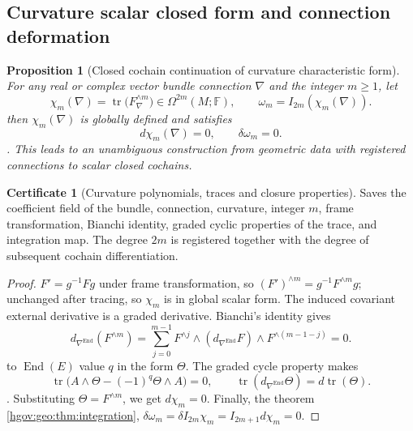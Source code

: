 \documentclass[12pt,a4paper,openany,notitlepage]{report}
\theoremstyle{plain}
\newtheorem{proposition}[theorem]{Proposition}
\theoremstyle{definition}
\newtheorem*{certificate}{Certificate}
\theoremstyle{remark}
\begin{document}
\begin{CJK*}
\section { Curvature scalar closed form and connection deformation }\label{exp:geo:section:curvature-classes}


\begin{proposition}
[Closed cochain continuation of curvature characteristic form]\label{hgov:geo:prop:curvature-cocycle}
For any real or complex vector bundle connection $\nabla$ and the integer $m\ge1$, let \[
\chi_m(\nabla)=\operatorname{tr}
\bigl(F_\nabla^{\wedge m}\bigr)\in\Omega^{2m}(M;\mathbb F),
\qquad
\omega_m=I_{2m}(\chi_m(\nabla)).
\] then $\chi_m(\nabla)$ is globally defined and satisfies \[
d\chi_m(\nabla)=0,\qquad\delta\omega_m=0.
\]. This leads to an unambiguous construction from geometric data with registered connections to scalar closed cochains.\end{proposition}


\begin{certificate}
[Curvature polynomials, traces and closure properties]Saves the coefficient field of the bundle, connection, curvature, integer $m$, frame transformation, Bianchi identity, graded cyclic properties of the trace, and integration map. The degree $2m$ is registered together with the degree of subsequent cochain differentiation.\end{certificate}


\begin{proof}
$F'=g^{-1}Fg$ under frame transformation, so $(F')^{\wedge m}=g^{-1}F^{\wedge m}g$; unchanged after tracing, so $\chi_m$ is in global scalar form. The induced covariant external derivative is a graded derivative. Bianchi's identity gives \[
d_{\nabla^{\operatorname{End}}}(F^{\wedge m})
=\sum_{j=0}^{m-1}
F^{\wedge j}\wedge
(d_{\nabla^{\operatorname{End}}}F)
\wedge F^{\wedge(m-1-j)}=0.
\] to $\operatorname{End}(E)$ value $q$ in the form $\Theta$. The graded cycle property makes \[
\operatorname{tr}\bigl(A\wedge\Theta-(-1)^q\Theta\wedge A\bigr)=0,
\qquad
\operatorname{tr}(d_{\nabla^{\operatorname{End}}}\Theta)
=d\operatorname{tr}(\Theta).
\]. Substituting $\Theta=F^{\wedge m}$, we get $d\chi_m=0$. Finally, the theorem ~ \ref{hgov:geo:thm:integration}, $\delta\omega_m=\delta I_{2m}\chi_m=I_{2m+1}d\chi_m=0$.\end{proof}



\end{CJK*}
\end{document}
